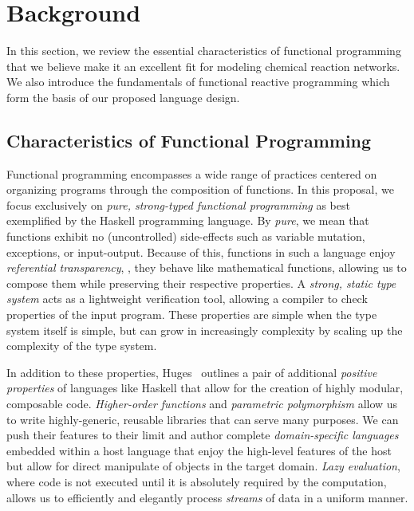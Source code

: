 
\section{Background}
\label{sec:frp_background}

In this section, we review the essential characteristics of functional programming that we believe make it an excellent fit for modeling chemical reaction networks.
We also introduce the fundamentals of functional reactive programming which form the basis of our proposed language design.

\subsection{Characteristics of Functional Programming}

Functional programming encompasses a wide range of practices centered on organizing programs through the composition of functions.
In this proposal, we focus exclusively on \emph{pure, strong-typed functional programming} as best exemplified by the Haskell programming language.
By \emph{pure}, we mean that functions exhibit no (uncontrolled) side-effects such as variable mutation, exceptions, or input-output.
Because of this, functions in such a language enjoy \emph{referential transparency}, \ie, they behave like mathematical functions, allowing us to compose them while preserving their respective properties.
A \emph{strong, static type system} acts as a lightweight verification tool, allowing a compiler to check properties of the input program.
These properties are simple when the type system itself is simple, but can grow in increasingly complexity by scaling up the complexity of the type system.

In addition to these properties, Huges~\cite{huges:1990} outlines a pair of additional \emph{positive properties} of languages like Haskell that allow for the creation of highly modular, composable code.
\emph{Higher-order functions} and \emph{parametric polymorphism} allow us to write highly-generic, reusable libraries that can serve many purposes.
We can push their features to their limit and author complete \emph{domain-specific languages} embedded within a host language that enjoy the high-level features of the host but allow for direct manipulate of objects in the target domain.
\emph{Lazy evaluation}, where code is not executed until it is absolutely required by the computation, allows us to efficiently and elegantly process \emph{streams} of data in a uniform manner.

